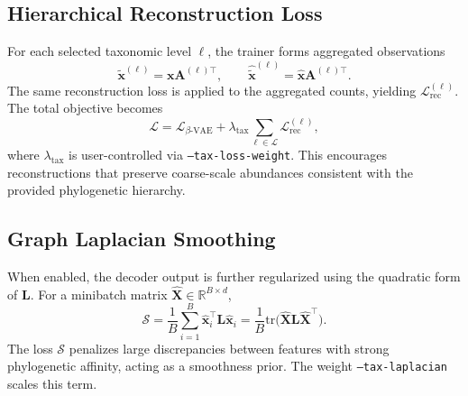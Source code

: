 \documentclass[11pt]{article}
\begin{document}
\subsection{Hierarchical Reconstruction Loss}
For each selected taxonomic level $\ell$, the trainer forms aggregated observations
\begin{equation}
    \tilde{\bm{x}}^{(\ell)} = \bm{x} \mathbf{A}^{(\ell)\top}, \qquad
    \hat{\tilde{\bm{x}}}^{(\ell)} = \hat{\bm{x}} \mathbf{A}^{(\ell)\top}.
\end{equation}
The same reconstruction loss is applied to the aggregated counts, yielding
$\mathcal{L}^{(\ell)}_{\mathrm{rec}}$. The total objective becomes
\begin{equation}
    \mathcal{L} = \mathcal{L}_{\beta\text{-VAE}} + \lambda_{\mathrm{tax}} \sum_{\ell \in \mathcal{L}} \mathcal{L}^{(\ell)}_{\mathrm{rec}},
\end{equation}
where $\lambda_{\mathrm{tax}}$ is user-controlled via \texttt{--tax-loss-weight}.
This encourages reconstructions that preserve coarse-scale abundances consistent with
the provided phylogenetic hierarchy.
\subsection{Graph Laplacian Smoothing}
When enabled, the decoder output is further regularized using the quadratic form of
$\mathbf{L}$. For a minibatch matrix $\hat{\mathbf{X}} \in \mathbb{R}^{B \times d}$,
\begin{equation}
    \mathcal{S} = \frac{1}{B} \sum_{i=1}^B \hat{\bm{x}}_i^{\top} \mathbf{L} \hat{\bm{x}}_i
    = \frac{1}{B} \mathrm{tr}\bigl(\hat{\mathbf{X}} \mathbf{L} \hat{\mathbf{X}}^{\top}\bigr).
\end{equation}
The loss $\mathcal{S}$ penalizes large discrepancies between features with strong
phylogenetic affinity, acting as a smoothness prior. The weight \texttt{--tax-laplacian}
scales this term.
\end{document}
